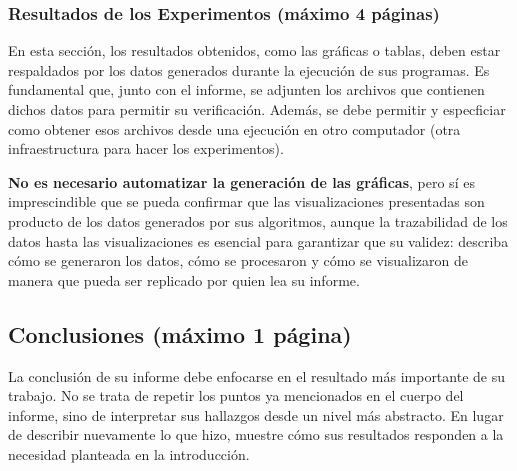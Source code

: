 \subsubsection{Resultados de los Experimentos (máximo 4 páginas)}

En esta sección, los resultados obtenidos, como las gráficas o tablas, deben estar respaldados por los datos generados durante la ejecución de sus programas. Es fundamental que, junto con el informe, se adjunten los archivos que contienen dichos datos para permitir su verificación. Además, se debe permitir y especficiar como obtener esos archivos desde una ejecución en otro computador (otra infraestructura para hacer los experimentos).

\textbf{No es necesario automatizar la generación de las gráficas}, pero sí es imprescindible que se pueda confirmar que las visualizaciones presentadas son producto de los datos generados por sus algoritmos, aunque la trazabilidad de los datos hasta las visualizaciones es esencial para garantizar que su validez: describa cómo se generaron los datos, cómo se procesaron y cómo se visualizaron de manera que pueda ser replicado por quien lea su informe.


\subsection{Conclusiones (máximo 1 página)}

La conclusión de su informe debe enfocarse en el resultado más importante de su trabajo. No se trata de repetir los puntos ya mencionados en el cuerpo del informe, sino de interpretar sus hallazgos desde un nivel más abstracto. En lugar de describir nuevamente lo que hizo, muestre cómo sus resultados responden a la necesidad planteada en la introducción.

